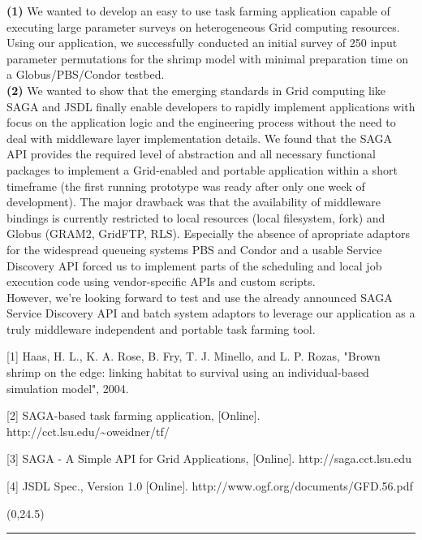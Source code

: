 \documentclass[a0b,portrait]{a0poster}
\def\LHead#1{\bigskip\bigskip\noindent{\huge\color{HeadColor} #1}\smallskip}
\begin{document}
\begin{textblock}{7}
\textbf{\color{DarkBlue}(1)} We wanted to develop an easy to use task farming 
application capable of executing large parameter surveys on heterogeneous Grid 
computing resources. Using our application, we successfully conducted an 
initial survey of 250 input parameter permutations for the shrimp model with 
minimal preparation time on a Globus/PBS/Condor testbed.\\[0.4em]
\textbf{\color{DarkBlue}(2)} We wanted to show that the emerging standards in 
Grid computing like SAGA and JSDL finally enable developers to rapidly implement 
applications with focus on the application logic and the engineering process 
without the need to deal with middleware layer implementation details. We found 
that the SAGA API provides the required level of abstraction and all necessary 
functional packages to implement a Grid-enabled and portable application within 
a short timeframe (the first running prototype was ready after only one week of 
development). The major drawback was that the availability of middleware bindings
is currently restricted to local resources (local filesystem, fork) and Globus
(GRAM2, GridFTP, RLS). Especially the absence of apropriate adaptors for the 
widespread queueing systems PBS and Condor and a usable Service Discovery API 
forced us to implement parts of the scheduling and local job execution code using 
vendor-specific APIs and custom scripts.\\[0.4em]
However, we're looking forward to test and use the already announced SAGA Service 
Discovery API and batch system adaptors to leverage our application as a truly 
middleware independent and portable task farming tool.

\LHead{References}

[1] Haas, H. L., K. A. Rose, B. Fry, T. J. Minello, and L. P. Rozas, "Brown shrimp on the
edge: linking habitat to survival using an individual-based simulation model", 2004. 

[2] SAGA-based task farming application, [Online]. http://cct.lsu.edu/\~{}oweidner/tf/

[3] SAGA - A Simple API for Grid Applications, [Online]. http://saga.cct.lsu.edu

[4] JSDL Spec., Version 1.0 [Online].
http://www.ogf.org/documents/GFD.56.pdf

\end{textblock}

\begin{textblock}{15}(0,24.5)
\color{LightGray}
\rule{\linewidth}{2pt}
\end{textblock}
\end{document}
